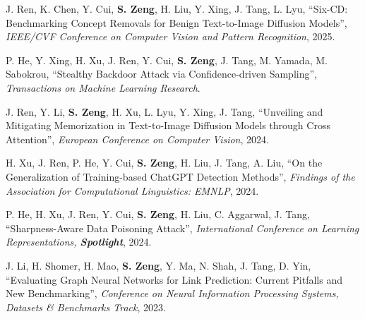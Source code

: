 \documentclass[12pt,letterpaper]{article}
\newenvironment{publist}{%
  \begin{list}{}{%
    \setlength{\leftmargin}{34mm}%
    \setlength{\labelwidth}{32mm}%
    \setlength{\labelsep}{2mm}%
    \setlength{\itemsep}{1.5mm}%
    \setlength{\parsep}{0pt}%
    \setlength{\topsep}{1.5mm}%
    \renewcommand{\makelabel}[1]{\bfseries\color{accent}##1\hfill}%
  }}{\end{list}}
\begin{document}
\begin{publist}
\item[{[CVPR'25]}] J. Ren, K. Chen, Y. Cui, \textbf{S. Zeng}, H. Liu, Y. Xing, J. Tang, L. Lyu, ``Six-CD: Benchmarking Concept Removals for Benign Text-to-Image Diffusion Models'', \textit{IEEE/CVF Conference on Computer Vision and Pattern Recognition}, 2025.
\item[{[TMLR]}] P. He, Y. Xing, H. Xu, J. Ren, Y. Cui, \textbf{S. Zeng}, J. Tang, M. Yamada, M. Sabokrou, ``Stealthy Backdoor Attack via Confidence-driven Sampling'', \textit{Transactions on Machine Learning Research}.
\item[{[ECCV'24]}] J. Ren, Y. Li, \textbf{S. Zeng}, H. Xu, L. Lyu, Y. Xing, J. Tang, ``Unveiling and Mitigating Memorization in Text-to-Image Diffusion Models through Cross Attention'', \textit{European Conference on Computer Vision}, 2024.
\item[{[EMNLP'24]}] H. Xu, J. Ren, P. He, Y. Cui, \textbf{S. Zeng}, H. Liu, J. Tang, A. Liu, ``On the Generalization of Training-based ChatGPT Detection Methods'', \textit{Findings of the Association for Computational Linguistics: EMNLP}, 2024.
\item[{[ICLR'24, Spotlight]}] P. He, H. Xu, J. Ren, Y. Cui, \textbf{S. Zeng}, H. Liu, C. Aggarwal, J. Tang, ``Sharpness-Aware Data Poisoning Attack'', \textit{International Conference on Learning Representations, \textbf{\color{honor}Spotlight}}, 2024.
\item[{[NeurIPS'23]}] J. Li, H. Shomer, H. Mao, \textbf{S. Zeng}, Y. Ma, N. Shah, J. Tang, D. Yin, ``Evaluating Graph Neural Networks for Link Prediction: Current Pitfalls and New Benchmarking'', \textit{Conference on Neural Information Processing Systems, Datasets \& Benchmarks Track}, 2023.
\end{publist}
\end{document}
